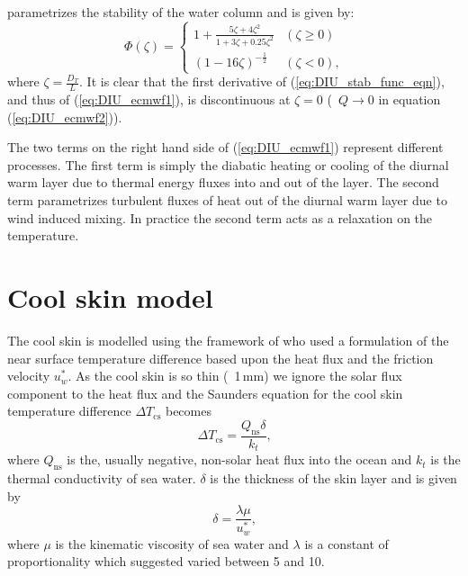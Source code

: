 \documentclass[../main/NEMO_manual]{subfiles}
\begin{document}
parametrizes the stability of the water column and is given by:
\begin{equation}
\Phi(\zeta) = \left\{ \begin{array}{cc} 1 + \frac{5\zeta +
4\zeta^2}{1+3\zeta+0.25\zeta^2} &(\zeta \ge 0) \\
                                    (1 - 16\zeta)^{-\frac{1}{2}} & (\zeta < 0) \mbox{,}
                                    \end{array} \right. \label{eq:DIU_stab_func_eqn}
\end{equation}
where $\zeta=\frac{D_T}{L}$.  It is clear that the first derivative of (\autoref{eq:DIU_stab_func_eqn}),
and thus of (\autoref{eq:DIU_ecmwf1}), is discontinuous at $\zeta=0$ (\ie\ $Q\rightarrow0$ in
equation (\autoref{eq:DIU_ecmwf2})).

The two terms on the right hand side of (\autoref{eq:DIU_ecmwf1}) represent different processes.
The first term is simply the diabatic heating or cooling of the diurnal warm layer due to
thermal energy fluxes into and out of the layer.
The second term parametrizes turbulent fluxes of heat out of the diurnal warm layer due to wind induced mixing.
In practice the second term acts as a relaxation on the temperature.

\section{Cool skin model}
\label{sec:DIU_cool_skin_sec}

The cool skin is modelled using the framework of \citet{saunders_JAS67} who used a formulation of the near surface temperature difference based upon the heat flux and the friction velocity $u^*_{w}$.
As the cool skin is so thin (~1\,mm) we ignore the solar flux component to the heat flux and the Saunders equation for the cool skin temperature difference $\Delta T_{\mathrm{cs}}$ becomes
\[
  \Delta T_{\mathrm{cs}}=\frac{Q_{\mathrm{ns}}\delta}{k_t} \mbox{,}
\]
where $Q_{\mathrm{ns}}$ is the, usually negative, non-solar heat flux into the ocean and
$k_t$ is the thermal conductivity of sea water.
$\delta$ is the thickness of the skin layer and is given by
\begin{equation}
\label{eq:DIU_sunders_thick_eqn}
\delta=\frac{\lambda \mu}{u^*_{w}} \mbox{,}
\end{equation}
where $\mu$ is the kinematic viscosity of sea water and $\lambda$ is a constant of proportionality which
\citet{saunders_JAS67} suggested varied between 5 and 10.
\end{document}
